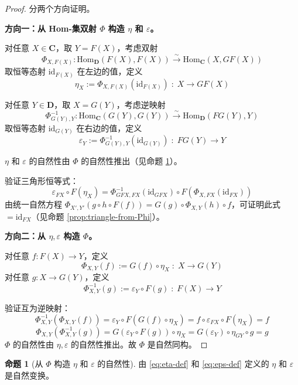 \documentclass[12pt,a4paper]{ctexart}
\theoremstyle{definition}
\newtheorem{proposition}[definition]{命题}
\newcommand{\cat}[1]{\mathbf{#1}}
\newcommand{\id}{\mathrm{id}}
\newcommand{\Hom}{\mathrm{Hom}}
\begin{document}
\begin{proof}
分两个方向证明。

\medskip\noindent\textbf{方向一：从 Hom-集双射 $\Phi$ 构造 $\eta$ 和 $\varepsilon$。}

对任意 $X \in \cat{C}$，取 $Y = F(X)$，考虑双射
\[
\Phi_{X, F(X)}: \Hom_{\cat{D}}(F(X), F(X)) \xrightarrow{\sim} \Hom_{\cat{C}}(X, GF(X))
\]
取恒等态射 $\id_{F(X)}$ 在左边的值，定义
\begin{equation}\label{eq:eta-def}
\eta_X := \Phi_{X, F(X)}(\id_{F(X)}) \; : \; X \to GF(X)
\end{equation}

对任意 $Y \in \cat{D}$，取 $X = G(Y)$，考虑逆映射
\[
\Phi_{G(Y), Y}^{-1}: \Hom_{\cat{C}}(G(Y), G(Y)) \xrightarrow{\sim} \Hom_{\cat{D}}(FG(Y), Y)
\]
取恒等态射 $\id_{G(Y)}$ 在右边的值，定义
\begin{equation}\label{eq:eps-def}
\varepsilon_Y := \Phi_{G(Y), Y}^{-1}(\id_{G(Y)}) \; : \; FG(Y) \to Y
\end{equation}

$\eta$ 和 $\varepsilon$ 的自然性由 $\Phi$ 的自然性推出（见命题 \ref{prop:naturality-eta-eps}）。

验证三角形恒等式：
\[
\varepsilon_{FX} \circ F(\eta_X)
= \Phi_{GFX,FX}^{-1}(\id_{GFX}) \circ F(\Phi_{X,FX}(\id_{FX}))
\]
由统一自然方程 $\Phi_{X',Y'}(g \circ h \circ F(f)) = G(g) \circ \Phi_{X,Y}(h) \circ f$，可证明此式 $= \id_{FX}$（见命题 \ref{prop:triangle-from-Phi}）。

\medskip\noindent\textbf{方向二：从 $\eta, \varepsilon$ 构造 $\Phi$。}

对任意 $f: F(X) \to Y$，定义
\[
\Phi_{X,Y}(f) := G(f) \circ \eta_X \; : \; X \to G(Y)
\]
对任意 $g: X \to G(Y)$，定义
\[
\Phi_{X,Y}^{-1}(g) := \varepsilon_Y \circ F(g) \; : \; F(X) \to Y
\]

验证互为逆映射：
\[
\Phi_{X,Y}^{-1}(\Phi_{X,Y}(f))
= \varepsilon_Y \circ F(G(f) \circ \eta_X)
= f \circ \varepsilon_{FX} \circ F(\eta_X)
= f
\]
\[
\Phi_{X,Y}(\Phi_{X,Y}^{-1}(g))
= G(\varepsilon_Y \circ F(g)) \circ \eta_X
= G(\varepsilon_Y) \circ \eta_{GY} \circ g
= g
\]
$\Phi$ 的自然性由 $\eta, \varepsilon$ 的自然性推出。故 $\Phi$ 是自然同构。
\end{proof}

\begin{proposition}[从 $\Phi$ 构造 $\eta$ 和 $\varepsilon$ 的自然性]\label{prop:naturality-eta-eps}
由 \eqref{eq:eta-def} 和 \eqref{eq:eps-def} 定义的 $\eta$ 和 $\varepsilon$ 是自然变换。
\end{proposition}
\end{document}
